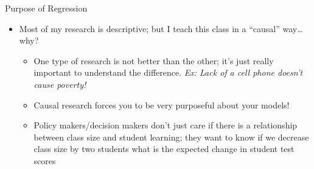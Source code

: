\documentclass[
  8pt,
  ignorenonframetext,
  dvipsnames]{beamer}
\providecommand{\tightlist}{%
  \setlength{\itemsep}{0pt}\setlength{\parskip}{0pt}}
\let\olditem\item
\renewcommand{\item}{%
  \olditem\vspace{4pt}
}
\begin{document}
\begin{frame}{Purpose of Regression}
\medskip

\begin{itemize}
\tightlist
\item
  Most of my research is descriptive; but I teach this class in a
  ``causal'' way\ldots{} why?

  \begin{itemize}
  \tightlist
  \item
    One type of research is not better than the other; it's just really
    important to understand the difference. \emph{Ex: Lack of a cell
    phone doesn't cause poverty!}
  \item
    Causal research forces you to be very purposeful about your models!
  \item
    Policy makers/decision makers don't just care if there is a
    relationship between class size and student learning; they want to
    know if we decrease class size by two students what is the expected
    change in student test scores
  \end{itemize}
\end{itemize}

\end{frame}
\end{document}
